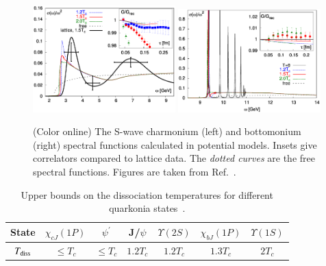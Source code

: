\begin{figure}[]
   \begin{center}
      {\includegraphics[width=0.49\textwidth]{Figures/Fig17l_JPsi_SpecFuncLattQCD.png}}
      {\includegraphics[width=0.49\textwidth]{Figures/Fig17r_Y1S_SpecFuncLattQCD.png}}
      \caption{(Color online) The S-wave charmonium (left) and 
        bottomonium (right) spectral functions calculated in potential 
        models. 
        Insets give correlators compared to lattice data.  
        The {\it dotted curves} are the
        free spectral functions. Figures are taken from Ref.~\cite{Mocsy:2007yj}.
      }
      \label{Fig:QuarkoniaSpecFuncLattice} 
   \end{center}
\end{figure}





\begin{table}[tb]
   \caption{Upper bounds on the dissociation 
             temperatures for different quarkonia states~\cite{Mocsy:2007jz}.
             }
   \label{tab:LatticeDissTemp}
   \setlength{\tabcolsep}{0.41pc}
   \begin{center}
      \begin{tabular}{ccccccc}
      \hline\hline
      State & $\chi_{cJ}(1P)$ & $\psi^{'}$ &J/$\psi$  &$\Upsilon(2S)$ & $\chi_{bJ}(1P)$ &$\Upsilon(1S)$ \\%
      \hline 
      $T_{\rm diss}$ & $\le T_c$ & $\le T_c$ & $1.2T_c$ & $1.2T_c$ & $1.3T_c$ & $2T_c$\\ 
\hline\hline
\end{tabular}
\end{center}
\end{table}



